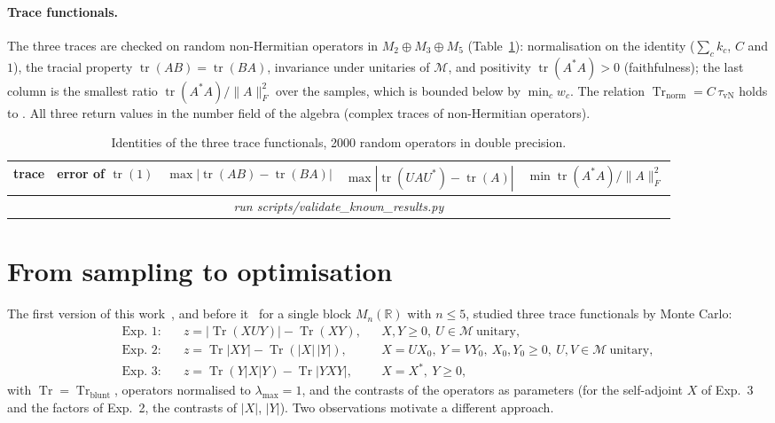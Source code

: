 \documentclass[11pt]{article}
\DeclareMathOperator{\Tr}{Tr}
\newcommand{\M}{\mathcal{M}}
\providecommand{\ValTraceRows}{\multicolumn{5}{c}{\emph{run scripts/validate\_known\_results.py}}\\}
\begin{document}
\paragraph{Trace functionals.} The three traces are checked on random non-Hermitian operators in
$M_2\oplus M_3\oplus M_5$ (Table~\ref{tab:traces}): normalisation on the identity ($\sum_ck_c$, $C$ and $1$),
the tracial property $\operatorname{tr}(AB)=\operatorname{tr}(BA)$, invariance under unitaries of $\M$, and
positivity $\operatorname{tr}(A^*A)>0$ (faithfulness); the last column is the smallest ratio
$\operatorname{tr}(A^*A)/\|A\|_F^2$ over the samples, which is bounded below by $\min_cw_c$. The relation $\Tr_{\mathrm{norm}}=C\,\tau_{\mathrm{vN}}$ holds to
. All three return values
in the number field of the algebra (complex traces of non-Hermitian operators).

\begin{table}[h]
\centering\small
\begin{tabular}{lcccc}
\toprule
trace & error of $\operatorname{tr}(1)$ & $\max|\operatorname{tr}(AB)-\operatorname{tr}(BA)|$ &
$\max|\operatorname{tr}(UAU^*)-\operatorname{tr}(A)|$ & $\min\operatorname{tr}(A^*A)/\|A\|_F^2$\\
\midrule
\ValTraceRows
\bottomrule
\end{tabular}
\caption[]{Identities of the three trace functionals, 2000 random operators in double precision.}
\label{tab:traces}
\end{table}

\section{From sampling to optimisation}\label{sec:optimisation}

The first version of this work~\cite{v1}, and before it~\cite[Sect.~5, Figs.~1--3]{abed2024} for a single block
$M_n(\mathbb R)$ with $n\le5$, studied three trace functionals by Monte Carlo:
\begin{align*}
  \text{Exp.~1:}\quad & z=|\Tr(XUY)|-\Tr(XY), && X,Y\ge0,\ U\in\M\ \text{unitary},\\
  \text{Exp.~2:}\quad & z=\Tr|XY|-\Tr(|X|\,|Y|), && X=UX_0,\ Y=VY_0,\ X_0,Y_0\ge0,\ U,V\in\M\ \text{unitary},\\
  \text{Exp.~3:}\quad & z=\Tr(Y|X|Y)-\Tr|YXY|, && X=X^*,\ Y\ge0,
\end{align*}
with $\Tr=\Tr_{\mathrm{blunt}}$, operators normalised to $\lambda_{\max}=1$, and the contrasts of the
operators as parameters (for the self-adjoint $X$ of Exp.~3 and the factors of Exp.~2, the contrasts of $|X|$, $|Y|$). Two observations motivate a different approach.
\end{document}
